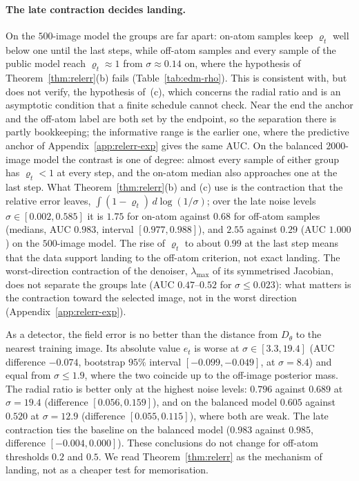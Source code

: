 \documentclass{article} %
\theoremstyle{plain}
\theoremstyle{definition}
\theoremstyle{remark}
\begin{document}
\paragraph{The late contraction decides landing.} On the $500$-image model the groups are far
apart: on-atom samples keep $\varrho_t$ well below one until the last steps, while off-atom samples
and every sample of the public model reach $\varrho_t\approx1$ from $\sigma\approx0.14$ on, where
the hypothesis of Theorem~\ref{thm:relerr}(b) fails (Table~\ref{tab:edm-rho}). This is consistent
with, but does not verify, the hypothesis of~(c), which concerns the radial ratio and is an
asymptotic condition that a finite schedule cannot check. Near the end the anchor and the off-atom
label are both set by the endpoint, so the separation there is partly bookkeeping; the informative
range is the earlier one, where the predictive anchor of Appendix~\ref{app:relerr-exp} gives the
same AUC. On the balanced
$2000$-image model the contrast is one of degree: almost every sample of either group has
$\varrho_t<1$ at every step, and the on-atom median also approaches one at the last step. What
Theorem~\ref{thm:relerr}(b) and (c) use is the contraction that the relative error leaves,
$\int(1-\varrho_t)\,d\log(1/\sigma)$; over the late noise levels $\sigma\in[0.002,0.585]$ it is $1.75$
for on-atom against $0.68$ for off-atom samples (medians, AUC $0.983$, interval $[0.977,0.988]$),
and $2.55$ against $0.29$ (AUC $1.000$) on the $500$-image model. The rise of $\varrho_t$ to about
$0.99$ at the last step means that the data support landing to the off-atom criterion, not exact
landing. The worst-direction
contraction of the denoiser, $\lambda_{\max}$ of its symmetrised Jacobian, does not separate the
groups late (AUC $0.47$--$0.52$ for $\sigma\le0.023$): what matters is the contraction toward the
selected image, not in the worst direction (Appendix~\ref{app:relerr-exp}).

As a detector, the field error is no better than the distance from $D_\theta$ to the nearest
training image. Its absolute value $e_t$ is worse at $\sigma\in[3.3,19.4]$ (AUC difference
$-0.074$, bootstrap $95\%$ interval $[-0.099,-0.049]$, at $\sigma=8.4$) and equal from
$\sigma\le1.9$, where the two coincide up to the off-image posterior mass. The radial ratio is better
only at the highest noise levels: $0.796$ against $0.689$ at $\sigma=19.4$ (difference
$[0.056,0.159]$), and on the balanced model $0.605$ against $0.520$ at $\sigma=12.9$ (difference
$[0.055,0.115]$), where both are weak. The late contraction ties the baseline on the balanced model
($0.983$ against $0.985$, difference $[-0.004,0.000]$). These conclusions do not change for off-atom
thresholds $0.2$ and $0.5$. We read Theorem~\ref{thm:relerr} as the mechanism of landing, not as a
cheaper test for memorisation.
\end{document}
